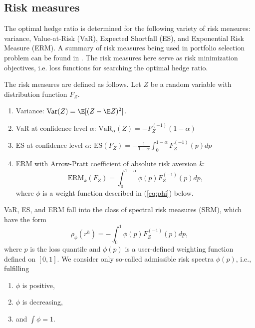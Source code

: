 \subsection{Risk measures}\label{subsec:spectral-risk-measures}
The optimal hedge ratio is determined for the following variety of risk measures: variance, Value-at-Risk (VaR), Expected Shortfall (ES), and Exponential Risk Measure (ERM).
A summary of risk measures being used in portfolio selection problem
can be found in \citet{hardle2008applied}. 
The risk measures here serve as risk minimization objectives, i.e. loss functions for searching the optimal hedge ratio. 

The risk measures are defined as follows.
Let $Z$ be a random
variable with distribution function $F_Z$.
\begin{enumerate}
\item Variance: $\text{Var}(Z) = \E[(Z-\E Z)^2]$. 
\item VaR at confidence level $\alpha$: $\text{VaR}_\alpha(Z) = -F_{Z}^{(-1)}(1-\alpha)$
\item ES at confidence level $\alpha$: $\text{ES}(F_Z) = -\frac{1}{1-\alpha}\int_0^{1-\alpha}F_Z^{(-1)}(p)dp$
\item ERM with Arrow-Pratt coefficient of absolute risk
  aversion $k$:
  \begin{equation*}
    \text{ERM}_k(F_Z) = \int_0^{1-\alpha}\phi(p) F_Z^{(-1)}(p)dp,
  \end{equation*}
  where $\phi$ is a weight function described in (\ref{eq:phi}) below.
\end{enumerate}

VaR, ES, and ERM fall into the class of spectral risk measures (SRM),
which have the form \citep{Acerbi2002}%
\begin{equation*}
  \rho_\phi(r^h) = - \int_0^1 \phi(p) F_{Z}^{(-1)}(p)d p,
\end{equation*}
where $p$ is the loss quantile and $\phi(p)$ is a user-defined
weighting function defined on $[0,1]$.
We consider only so-called admissible risk spectra $\phi(p)$, i.e.,
fulfilling %
\begin{enumerate}[label=(\roman*)]
\item $\phi$ is positive,
\item $\phi$ is decreasing,
\item and $\int\phi=1$. 
\end{enumerate}


